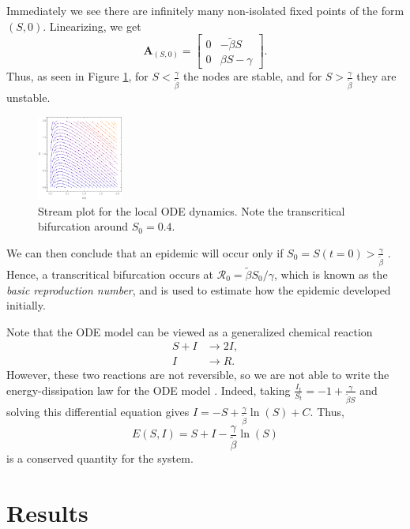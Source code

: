 \documentclass[11pt]{article}
\newcommand{\Ro}{\mathcal{R}_0}
\begin{document}
Immediately we see there are infinitely many non-isolated fixed points of the form $(S,0)$.
Linearizing, we get
\begin{equation*}
	\mathbf{A}_{(S,0)} = \begin{bmatrix} 0 & - \tilde{\beta} S \\ 0 & \beta S - \gamma \end{bmatrix}.
\end{equation*}
Thus, as seen in Figure \ref{fig:localdyn}, for $S < \frac{\gamma}{\tilde{\beta}}$ the nodes are stable, and for $S > \frac{\gamma}{\tilde{\beta}}$ they are unstable.
\begin{figure}[h]
	\centering
	\includegraphics[width=0.25\textwidth]{local_dynamics}
	\caption{Stream plot for the local ODE dynamics. Note the transcritical bifurcation around $S_0 = 0.4$.}
	\label{fig:localdyn}
\end{figure}
We can then conclude that an epidemic will occur only if $S_0 = S(t=0) > \frac{\gamma}{\tilde{\beta}}$ \cite{Wang_SIR}.
Hence, a transcritical bifurcation occurs at $\Ro = \tilde{\beta} S_0 / \gamma$, which is known as the \textit{basic reproduction number}, and is used to estimate how the epidemic developed initially.

Note that the ODE model can be viewed as a generalized chemical reaction
\begin{align*}
	S + I	&\longrightarrow	2 I, \\
	I		&\longrightarrow	R.
\end{align*}
However, these two reactions are not reversible, so we are not able to write the energy-dissipation law for the ODE model \cite{Forster_2013, Wang_2020}.
Indeed, taking $\frac{I_t}{S_t} = - 1 + \frac{\gamma}{\tilde{\beta} S}$ and solving this differential equation gives $I = - S + \frac{\gamma}{\tilde{\beta}} \ln(S) + C$.
Thus,
\begin{equation}
	E(S,I) = S + I - \frac{\gamma}{\tilde{\beta}} \ln(S)
\end{equation}
is a conserved quantity for the system.

\section{Results}
\end{document}
